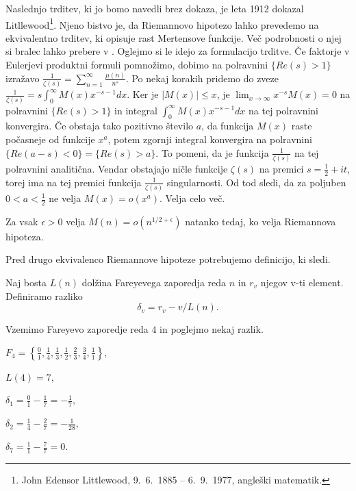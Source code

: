 \documentclass[mat1]{fmfdelo}
\begin{document}
Naslednjo trditev, ki jo bomo navedli brez dokaza, je leta 1912 dokazal Litllewood\footnote{John Edensor Littlewood, 9.\ 6.\ 1885 -- 6.\ 9.\ 1977, angleški matematik.}. Njeno bistvo je, da Riemannovo hipotezo lahko prevedemo na ekvivalentno trditev, ki opisuje rast Mertensove funkcije. 
Več podrobnosti o njej si bralec lahko prebere v \cite[poglavje 12.1]{zetafunction}.
%
Oglejmo si le idejo za formulacijo trditve. Če faktorje v Eulerjevi produktni formuli pomnožimo, dobimo na polravnini $\{Re(s)>1\}$ izražavo $ \frac{1}{\zeta(s)} = \sum_{n=1}^{\infty} \frac{\mu(n)}{n^s} $. 
Po nekaj korakih pridemo do zveze $ \frac{1}{\zeta(s)} = s \int_{0}^{\infty} M(x) x^{-s-1}dx $. 
Ker je $ |M(x)| \leq x $, je $ \lim_{x \to \infty} x^{-s}M(x) = 0$ na polravnini $\{Re(s)>1\}$ in integral $ \int_{0}^{\infty} M(x) x^{-s-1}dx $ na tej polravnini konvergira.
Če obstaja tako pozitivno število $a$, da funkcija $M(x)$ raste počasneje od funkcije $x^{a}$, potem zgornji integral konvergira na polravnini $\{Re(a-s)<0\} = \{Re(s)>a\}$.
To pomeni, da je funkcija $ \frac{1}{\zeta(s)} $ na tej polravnini analitična. 
Vendar obstajajo ničle funkcije $\zeta(s)$ na premici $s = \frac{1}{2}+it $, torej ima na tej premici funkcija $\frac{1}{\zeta(s)}$ singularnosti.
Od tod sledi, da za poljuben $0<a<\frac{1}{2}$ ne velja $M(x) = o(x^{a})$.
Velja celo več.

\begin{trditev}
Za vsak $\epsilon>0$ velja \( M(n) = o(n^{1/2+\epsilon}) \) natanko tedaj, ko velja Riemannova hipoteza.
\end{trditev}

Pred drugo ekvivalenco Riemannove hipoteze potrebujemo definicijo, ki sledi.

\begin{definicija}
Naj bosta $L(n)$ dolžina Fareyevega zaporedja reda $n$ in $r_{v}$ njegov v-ti element. Definiramo razliko
\begin{equation}
\delta_{v}= r_{v}-v/L(n).
\end{equation}
\end{definicija}

\begin{primer}
Vzemimo Fareyevo zaporedje reda $4$ in poglejmo nekaj razlik. 

\(F_4 = \left \{\frac{0}{1}, \frac{1}{4}, \frac{1}{3}, \frac{1}{2}, \frac{2}{3}, \frac{3}{4}, \frac{1}{1} \right \}, \)

\( L(4) = 7, \)

\( \delta_{1}= \frac{0}{1} - \frac{1}{7} = -\frac{1}{7}, \)

\( \delta_{2}= \frac{1}{4} - \frac{2}{7} = -\frac{1}{28}, \)

\( \delta_{7}= \frac{1}{1} - \frac{7}{7} = 0. \)
\end{primer}
\end{document}
